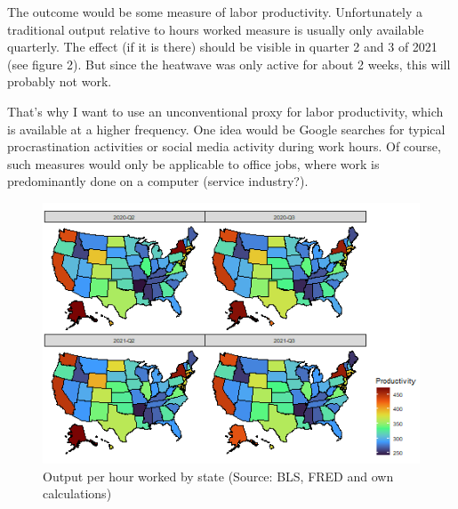 \documentclass[11pt]{article}
\begin{document}
The outcome would be some measure of labor productivity. Unfortunately a traditional output relative to hours worked measure is usually only available quarterly. The effect (if it is there) should be visible in quarter 2 and 3 of 2021 (see figure 2). But since the heatwave was only active for about 2 weeks, this will probably not work.

That's why I want to use  an unconventional proxy for labor productivity, which is available at a higher frequency. One idea would be Google searches for typical procrastination activities or social media activity during work hours. Of course, such measures would only be applicable to office jobs, where work is predominantly done on a computer (service industry?). 


\begin{figure}[h]
	\centering
	\includegraphics[scale = 0.8]{ProdMap}
	\caption{Output per hour worked by state (Source: BLS, FRED and own calculations)}
\end{figure}






\end{document}
